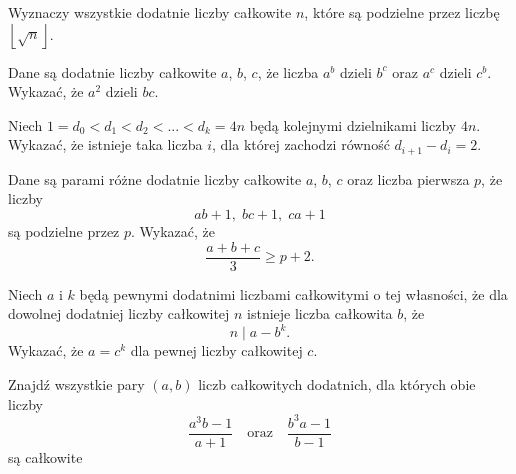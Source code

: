 \begin{problem}{1}
	Wyznaczy wszystkie dodatnie liczby całkowite $n$, które są podzielne przez liczbę $\left\lfloor \sqrt{n} \right\rfloor$.
\end{problem}

\begin{problem}{2}
	Dane są dodatnie liczby całkowite $a$, $b$, $c$, że liczba $a^b$ dzieli $b^c$ oraz $a^c$ dzieli $c^b$. Wykazać, że $a^2$ dzieli $bc$.
\end{problem}

\begin{problem}{3}
	Niech $1 = d_0 < d_1 < d_2 < ... < d_k = 4n$ będą kolejnymi dzielnikami liczby $4n$. Wykazać, że istnieje taka liczba $i$, dla której zachodzi równość $d_{i + 1} - d_i = 2$.
\end{problem}

\begin{problem}{4}
	Dane są parami różne dodatnie liczby całkowite $a$, $b$, $c$ oraz liczba pierwsza $p$, że liczby
	\[
		ab + 1, \; bc + 1, \; ca + 1
	\] 
	są podzielne przez $p$. Wykazać, że
	\[
		\frac{a + b + c}{3} \geqslant p + 2.
	\]
\end{problem}


\begin{problem}{5}
	Niech $a$ i $k$ będą pewnymi dodatnimi liczbami całkowitymi o tej własności, że dla dowolnej dodatniej liczby całkowitej $n$ istnieje liczba całkowita $b$, że
	\[
		n \mid a - b^k.
	\]
	Wykazać, że $a = c^k$ dla pewnej liczby całkowitej $c$.
\end{problem}

\begin{problem}{6}
	Znajdź wszystkie pary $(a, b)$ liczb całkowitych dodatnich, dla których obie liczby
	\[
		\frac{a^3b - 1}{a + 1} \quad \text{oraz} \quad \frac{b^3a - 1}{b - 1}
	\]
	są całkowite
\end{problem}